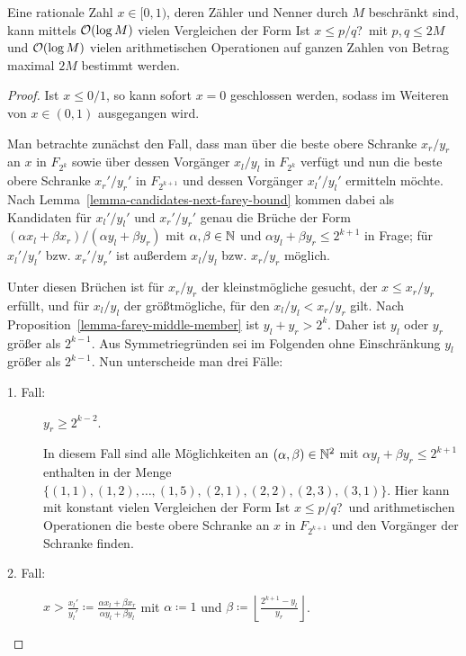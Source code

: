 \begin{theorem}\label{theorem-find-fraction}
	Eine rationale Zahl $x\in[0,1)$, deren Zähler und Nenner durch $M$ beschränkt sind, kann mittels $\mathcal{O}(\log M)$ vielen Vergleichen der Form \glqq Ist $x\leq p/q$?\grqq\ mit $p,q\leq 2M$ und $\mathcal{O}(\log M)$ vielen arithmetischen Operationen auf ganzen Zahlen von Betrag maximal $2M$ bestimmt werden.
\end{theorem}
\begin{proof}
	Ist $x\leq 0/1$, so kann sofort $x=0$ geschlossen werden, sodass im Weiteren von $x\in(0,1)$ ausgegangen wird.
	
	Man betrachte zunächst den Fall, dass man über die beste obere Schranke $x_r/y_r$ an $x$ in $F_{2^k}$ sowie über dessen Vorgänger $x_l/y_l$ in $F_{2^k}$ verfügt und nun die beste obere Schranke $x_r'/y_r'$ in $F_{2^{k+1}}$ und dessen Vorgänger $x_l'/y_l'$ ermitteln möchte.
	Nach Lemma~\ref{lemma-candidates-next-farey-bound} kommen dabei als Kandidaten für $x_l'/y_l'$ und $x_r'/y_r'$ genau die Brüche der Form $(\alpha x_l + \beta x_r)/(\alpha y_l + \beta y_r)$ mit $\alpha,\beta\in\mathbb{N}$ und $\alpha y_l + \beta y_r \leq 2^{k+1}$ in Frage; für $x_l'/y_l'$ bzw. $x_r'/y_r'$ ist außerdem $x_l/y_l$ bzw. $x_r/y_r$ möglich.
	
	Unter diesen Brüchen ist für $x_r/y_r$ der kleinstmögliche gesucht, der $x\leq x_r/y_r$ erfüllt, und für $x_l/y_l$ der größtmögliche, für den $x_l/y_l < x_r/y_r$ gilt.
	Nach Proposition~\ref{lemma-farey-middle-member} ist $y_l + y_r > 2^k$.
	Daher ist $y_l$ oder $y_r$ größer als $2^{k-1}$.
	Aus Symmetriegründen sei im Folgenden ohne Einschränkung $y_l$ größer als $2^{k-1}$.
	Nun unterscheide man drei Fälle:
	
	\begin{description}
		\item[1. Fall:] $y_r \geq 2^{k-2}$.
		
		In diesem Fall sind alle Möglichkeiten an $(\alpha,\beta)\in\mathbb{N}^2$ mit $\alpha y_l + \beta y_r \leq 2^{k+1}$ enthalten in der Menge $\{ (1,1), (1,2),\dots,(1,5), (2,1), (2,2),(2,3),(3,1) \}$.
		Hier kann mit konstant vielen Vergleichen der Form \glqq Ist $x\leq p/q$?\grqq\ und arithmetischen Operationen die beste obere Schranke an $x$ in $F_{2^{k+1}}$ und den Vorgänger der Schranke finden.
		
		\item[2. Fall:] $x > \frac{x_l'}{y_l'} \coloneq \frac{\alpha x_l + \beta x_r}{\alpha y_l + \beta y_l}$ mit $\alpha \coloneq 1$ und $\beta \coloneq \left\lfloor \frac{2^{k+1} - y_l}{y_r}\right\rfloor$.
		

\end{description}
\end{proof}
